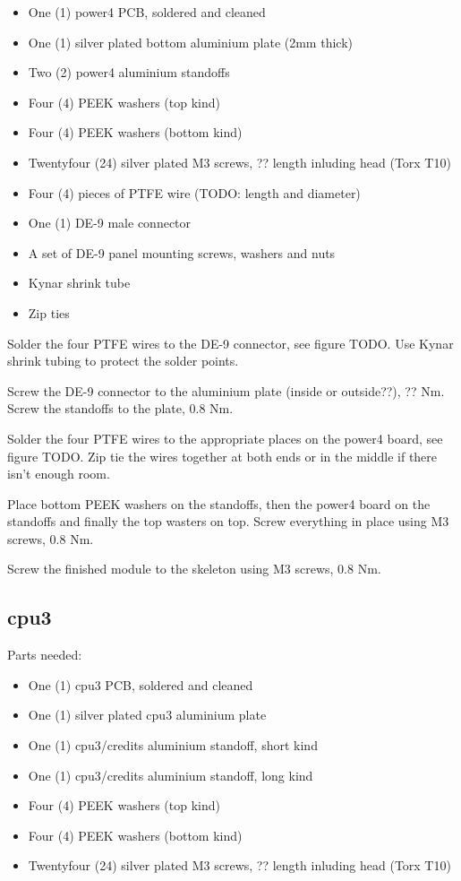 \documentclass{article}
\begin{document}
\begin{itemize}
\item One (1) power4 PCB, soldered and cleaned
\item One (1) silver plated bottom aluminium plate (2mm thick)
\item Two (2) power4 aluminium standoffs
\item Four (4) PEEK washers (top kind)
\item Four (4) PEEK washers (bottom kind)
\item Twentyfour (24) silver plated M3 screws, ?? length inluding head (Torx T10)
\item Four (4) pieces of PTFE wire (TODO: length and diameter)
\item One (1) DE-9 male connector
\item A set of DE-9 panel mounting screws, washers and nuts
\item Kynar shrink tube
\item Zip ties
\end{itemize}

Solder the four PTFE wires to the DE-9 connector, see figure TODO.
Use Kynar shrink tubing to protect the solder points.

Screw the DE-9 connector to the aluminium plate (inside or outside??), ?? Nm.
Screw the standoffs to the plate, 0.8 Nm.

Solder the four PTFE wires to the appropriate places on the power4 board, see figure TODO.
Zip tie the wires together at both ends or in the middle if there isn't enough room.

Place bottom PEEK washers on the standoffs, then the power4 board on the standoffs and finally the top wasters on top.
Screw everything in place using M3 screws, 0.8 Nm.

Screw the finished module to the skeleton using M3 screws, 0.8 Nm.

\subsection{cpu3}

Parts needed:

\begin{itemize}
\item One (1) cpu3 PCB, soldered and cleaned
\item One (1) silver plated cpu3 aluminium plate
\item One (1) cpu3/credits aluminium standoff, short kind
\item One (1) cpu3/credits aluminium standoff, long kind
\item Four (4) PEEK washers (top kind)
\item Four (4) PEEK washers (bottom kind)
\item Twentyfour (24) silver plated M3 screws, ?? length inluding head (Torx T10)
\end{itemize}
\end{document}
